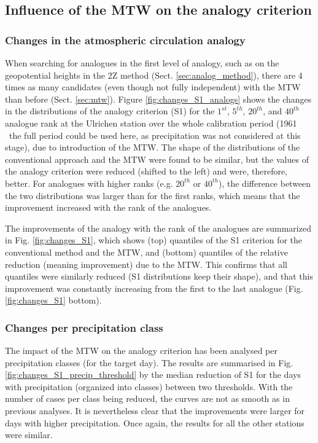 \documentclass[hess, manuscript]{copernicus}
\begin{document}
	
	\subsection{Influence of the MTW on the analogy criterion}
	\label{sec:influence_criteria}
	
	\subsubsection{Changes in the atmospheric circulation analogy}
	\label{sec:perf_2Z}
	
	When searching for analogues in the first level of analogy, such as on the geopotential heights in the 2Z method (Sect. \ref{sec:analog_method}), there are 4 times as many candidates (even though not fully independent) with the MTW than before (Sect. \ref{sec:mtw}). Figure \ref{fig:changes_S1_analogs} shows the changes in the distributions of the analogy criterion (S1) for the $1^{st}$, $5^{th}$, $20^{th}$, and $40^{th}$ analogue rank at the Ulrichen station over the whole calibration period (1961 \textendash\ the full period could be used here, as precipitation was not considered at this stage), due to introduction of the MTW. The shape of the distributions of the conventional approach and the MTW were found to be similar, but the values of the analogy criterion were reduced (shifted to the left) and were, therefore, better. For analogues with higher ranks (e.g. $20^{th}$ or $40^{th}$), the difference between the two distributions was larger than for the first ranks, which means that the improvement increased with the rank of the analogues. 
	
	The improvements of the analogy with the rank of the analogues are summarized in Fig. \ref{fig:changes_S1}, which shows (top) quantiles of the S1 criterion for the conventional method and the MTW, and (bottom) quantiles of the relative reduction (meaning improvement) due to the MTW. This confirms that all quantiles were similarly reduced (S1 distributions keep their shape), and that this improvement was constantly increasing from the first to the last analogue (Fig. \ref{fig:changes_S1} bottom).
	
	
	\subsubsection{Changes per precipitation class}
	\label{sec:influence_precip}
	
	The impact of the MTW on the analogy criterion has been analysed per precipitation classes (for the target day). The results are summarised in Fig. \ref{fig:changes_S1_precip_threshold} by the median reduction of S1 for the days with precipitation (organized into classes) between two thresholds. With the number of cases per class being reduced, the curves are not as smooth as in previous analyses. It is nevertheless clear that the improvements were larger for days with higher precipitation. Once again, the results for all the other stations were similar.
	
\end{document}
